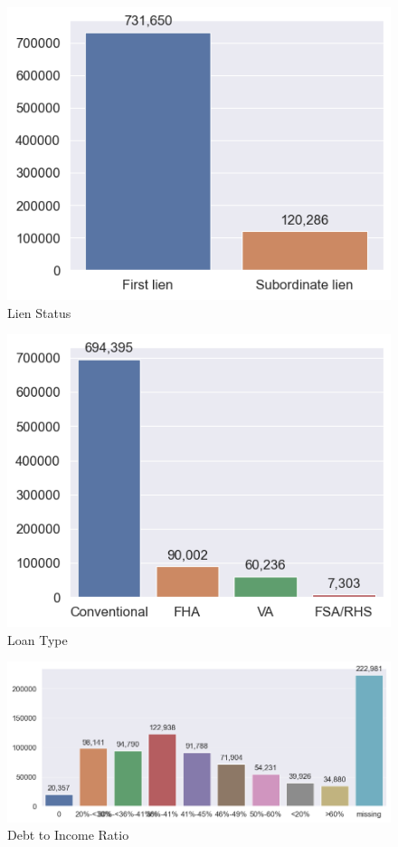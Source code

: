 \begin{figure}[!htbp]
    \begin{minipage}{0.5\textwidth}
        \centering
        \includegraphics[width=\textwidth]{images/HMDA_features/HMDA_features_lien.png}
        \small
        Lien Status
    \end{minipage}\hfill
    \begin{minipage}{0.5\textwidth}
        \centering
        \includegraphics[width=\textwidth]{images/HMDA_features/HMDA_features_type.png} 
        \small
        Loan Type
    \end{minipage}


    \centering
    \includegraphics[width=\textwidth]{images/HMDA_features/HMDA_features_dtir.png}
    \small
    Debt to Income Ratio


\end{figure}
